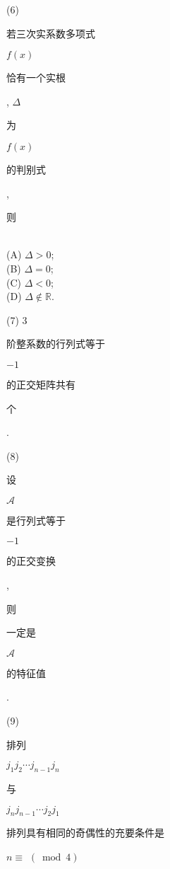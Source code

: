 \documentclass[10pt]{article}
\begin{document}
(6) \begin{CJK}{UTF8}{mj}若三次实系数多项式\end{CJK} $f(x)$ \begin{CJK}{UTF8}{mj}恰有一个实根\end{CJK}, $\Delta$ \begin{CJK}{UTF8}{mj}为\end{CJK} $f(x)$ \begin{CJK}{UTF8}{mj}的判别式\end{CJK}, \begin{CJK}{UTF8}{mj}则\end{CJK}\\
(A) $\Delta>0$;\\
(B) $\Delta=0$;\\
(C) $\Delta<0$;\\
(D) $\Delta \notin \mathbb{R}$.

(7) 3 \begin{CJK}{UTF8}{mj}阶整系数的行列式等于\end{CJK} $-1$ \begin{CJK}{UTF8}{mj}的正交矩阵共有\end{CJK} \begin{CJK}{UTF8}{mj}个\end{CJK}.

(8) \begin{CJK}{UTF8}{mj}设\end{CJK} $\mathscr{A}$ \begin{CJK}{UTF8}{mj}是行列式等于\end{CJK} $-1$ \begin{CJK}{UTF8}{mj}的正交变换\end{CJK}, \begin{CJK}{UTF8}{mj}则\end{CJK} \begin{CJK}{UTF8}{mj}一定是\end{CJK} $\mathscr{A}$ \begin{CJK}{UTF8}{mj}的特征值\end{CJK}.

(9) \begin{CJK}{UTF8}{mj}排列\end{CJK} $j_{1} j_{2} \cdots j_{n-1} j_{n}$ \begin{CJK}{UTF8}{mj}与\end{CJK} $j_{n} j_{n-1} \cdots j_{2} j_{1}$ \begin{CJK}{UTF8}{mj}排列具有相同的奇偶性的充要条件是\end{CJK} $n \equiv$ $(\bmod 4)$
\end{document}
